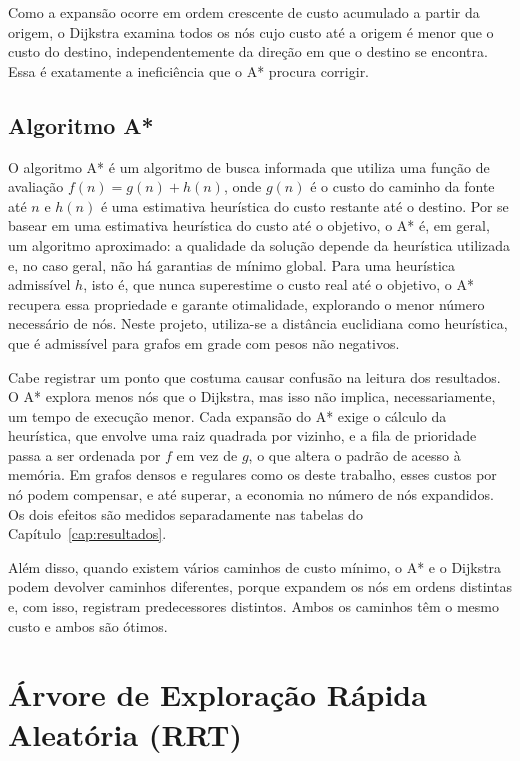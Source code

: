 \documentclass[
    12pt,
    openright,
    oneside,
    a4paper,
    english,
    brazil
]{abntex2}
\begin{document}
Como a expansão ocorre em ordem crescente de custo acumulado a partir da origem, o Dijkstra examina todos os nós cujo custo até a origem é menor que o custo do destino, independentemente da direção em que o destino se encontra. Essa é exatamente a ineficiência que o A* procura corrigir.

\subsection{Algoritmo A*}

O algoritmo A* \cite{hart1968} é um algoritmo de busca informada que utiliza uma função de avaliação $f(n) = g(n) + h(n)$, onde $g(n)$ é o custo do caminho da fonte até $n$ e $h(n)$ é uma estimativa heurística do custo restante até o destino. Por se basear em uma estimativa heurística do custo até o objetivo, o A* é, em geral, um algoritmo aproximado: a qualidade da solução depende da heurística utilizada e, no caso geral, não há garantias de mínimo global. Para uma heurística admissível $h$, isto é, que nunca superestime o custo real até o objetivo, o A* recupera essa propriedade e garante otimalidade, explorando o menor número necessário de nós. Neste projeto, utiliza-se a distância euclidiana como heurística, que é admissível para grafos em grade com pesos não negativos.

Cabe registrar um ponto que costuma causar confusão na leitura dos resultados. O A* explora menos nós que o Dijkstra, mas isso não implica, necessariamente, um tempo de execução menor. Cada expansão do A* exige o cálculo da heurística, que envolve uma raiz quadrada por vizinho, e a fila de prioridade passa a ser ordenada por $f$ em vez de $g$, o que altera o padrão de acesso à memória. Em grafos densos e regulares como os deste trabalho, esses custos por nó podem compensar, e até superar, a economia no número de nós expandidos. Os dois efeitos são medidos separadamente nas tabelas do Capítulo~\ref{cap:resultados}.

Além disso, quando existem vários caminhos de custo mínimo, o A* e o Dijkstra podem devolver caminhos diferentes, porque expandem os nós em ordens distintas e, com isso, registram predecessores distintos. Ambos os caminhos têm o mesmo custo e ambos são ótimos.

\section{Árvore de Exploração Rápida Aleatória (RRT)}
\label{sec:rrt}
\end{document}
